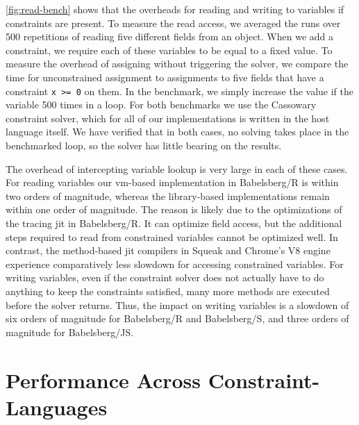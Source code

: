 \autoref{fig:read-bench} shows that the overheads for reading and writing to
variables if constraints are present. To measure the read access, we averaged
the runs over 500 repetitions of reading five different fields from an
object. When we add a constraint, we require each of these variables to be equal
to a fixed value. To measure the overhead of assigning without triggering the
solver, we compare the time for unconstrained assignment to assignments to five
fields that have a constraint \lstinline{x >= 0} on them. In the benchmark, we
simply increase the value if the variable 500 times in a loop. For both
benchmarks we use the Cassowary constraint solver, which for all of our
implementations is written in the host language itself. We have verified that in
both cases, no solving takes place in the benchmarked loop, so the solver has
little bearing on the results.

The overhead of intercepting variable lookup is very large in each of these
cases. For reading variables our \ac{vm}-based implementation in Babelsberg/R is
within two orders of magnitude, whereas the library-based implementations remain
within one order of magnitude. The reason is likely due to the optimizations of
the tracing \ac{jit} in Babelsberg/R. It can optimize field access, but the
additional steps required to read from constrained variables cannot be optimized
well. In contrast, the method-based \ac{jit} compilers in Squeak and Chrome's V8
\javascript engine experience comparatively less slowdown for accessing
constrained variables. For writing variables, even if the constraint solver does
not actually have to do anything to keep the constraints satisfied, many more
methods are executed before the solver returns. Thus, the impact on writing
variables is a slowdown of six orders of magnitude for Babelsberg/R and
Babelsberg/S, and three orders of magnitude for Babelsberg/JS.


\section{Performance Across Constraint-Languages}

